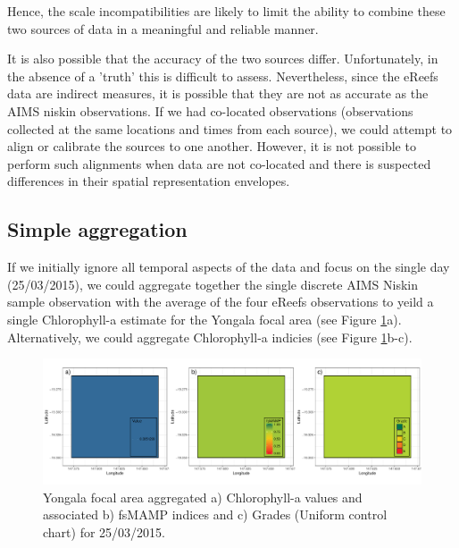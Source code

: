 Hence, the scale incompatibilities are likely to limit the ability to combine these two
sources of data in a meaningful and reliable manner.

It is also possible that the accuracy of the two sources differ.  Unfortunately, in the
absence of a 'truth' this is difficult to assess.  Nevertheless, since the eReefs data
are indirect measures, it is possible that they are not as accurate as the AIMS niskin
observations.  If we had co-located observations (observations collected at the same locations and
times from each source), we could attempt to align or calibrate the sources to one another.
However, it is not possible to perform such alignments when data are not co-located and there
is suspected differences in their spatial representation envelopes.

\subsection{Simple aggregation}

If we initially ignore all temporal aspects of the data and focus on the single day (25/03/2015),
we could aggregate together the single discrete AIMS Niskin sample observation with the average of the four
eReefs observations to yeild a single Chlorophyll-a estimate for the Yongala focal area  (see Figure \ref{fig:focalArea_Spatial.Yongala_Measure_Method1.1.chl}a).  Alternatively,
we could aggregate Chlorophyll-a indicies (see Figure \ref{fig:focalArea_Spatial.Yongala_Measure_Method1.1.chl}b-c).

\begin{figure}[!hptb]
  \includegraphics[width=\textwidth]{figures/FocalAreas/focalArea_Spatial.Yongala_Measure.chl_Method1.1.pdf}
    \caption[Illustration of simple multi source aggregation for the Yongala focal area]{Yongala focal area aggregated a) Chlorophyll-a values and associated b) fsMAMP indices and c) Grades (Uniform control chart) for 25/03/2015.}\label{fig:focalArea_Spatial.Yongala_Measure_Method1.1.chl}
\end{figure}

